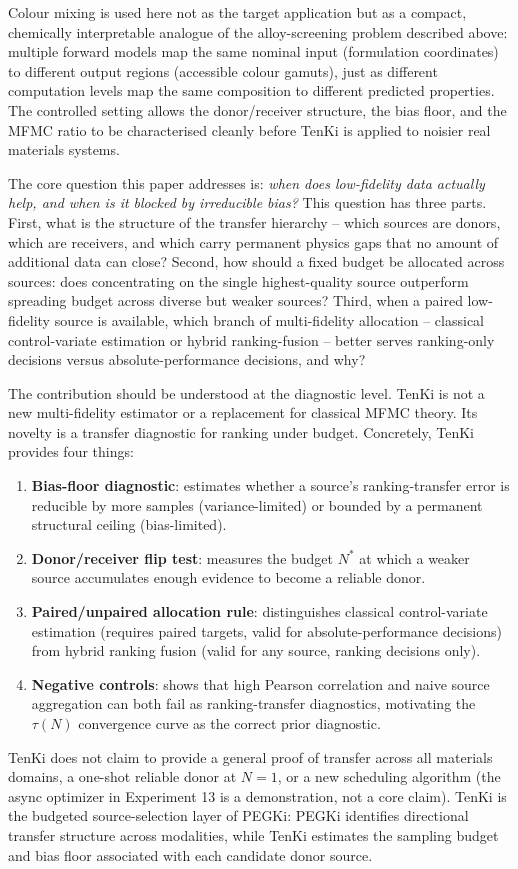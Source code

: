 \documentclass[twoside,twocolumn,9pt]{article}
\begin{document}
Colour mixing is used here not as the target application but as a compact, chemically interpretable analogue of the alloy-screening problem described above: multiple forward models map the same nominal input (formulation coordinates) to different output regions (accessible colour gamuts), just as different computation levels map the same composition to different predicted properties. The controlled setting allows the donor/receiver structure, the bias floor, and the MFMC ratio to be characterised cleanly before TenKi is applied to noisier real materials systems.\cite{Ginsburg2023ExploringBenchmarks,Lo2024FrugalTwin,Ackolf2025PEGKi}

The core question this paper addresses is: \textit{when does low-fidelity data actually help, and when is it blocked by irreducible bias?} This question has three parts. First, what is the structure of the transfer hierarchy -- which sources are donors, which are receivers, and which carry permanent physics gaps that no amount of additional data can close? Second, how should a fixed budget be allocated across sources: does concentrating on the single highest-quality source outperform spreading budget across diverse but weaker sources? Third, when a paired low-fidelity source is available, which branch of multi-fidelity allocation -- classical control-variate estimation or hybrid ranking-fusion -- better serves ranking-only decisions versus absolute-performance decisions, and why?

The contribution should be understood at the diagnostic level. TenKi is not a new multi-fidelity estimator or a replacement for classical MFMC theory. Its novelty is a transfer diagnostic for ranking under budget. Concretely, TenKi provides four things:
\begin{enumerate}
\item \textbf{Bias-floor diagnostic}: estimates whether a source's ranking-transfer error is reducible by more samples (variance-limited) or bounded by a permanent structural ceiling (bias-limited).
\item \textbf{Donor/receiver flip test}: measures the budget $N^*$ at which a weaker source accumulates enough evidence to become a reliable donor.
\item \textbf{Paired/unpaired allocation rule}: distinguishes classical control-variate estimation (requires paired targets, valid for absolute-performance decisions) from hybrid ranking fusion (valid for any source, ranking decisions only).
\item \textbf{Negative controls}: shows that high Pearson correlation and naive source aggregation can both fail as ranking-transfer diagnostics, motivating the $\tau(N)$ convergence curve as the correct prior diagnostic.
\end{enumerate}
TenKi does not claim to provide a general proof of transfer across all materials domains, a one-shot reliable donor at $N=1$, or a new scheduling algorithm (the async optimizer in Experiment 13 is a demonstration, not a core claim). TenKi is the budgeted source-selection layer of PEGKi: PEGKi identifies directional transfer structure across modalities, while TenKi estimates the sampling budget and bias floor associated with each candidate donor source.
\end{document}
